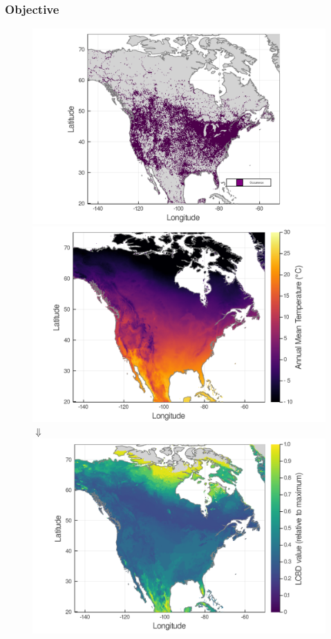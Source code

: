 \documentclass[10pt]{beamer}
\begin{document}
\begin{frame}
  \frametitle{Objective}
  \begin{figure}
    \centering
    \hspace*{-0cm}\includegraphics[scale=0.06]{fig/01_raw_singlesp.png}%
    \hspace*{0cm}\includegraphics[scale=0.06]{fig/wc_temp.png}
    \vfill
    $\Downarrow$
    \vfill
    \includegraphics[scale=0.10]{fig/05_sdm_lcbd.png}
  \end{figure}
\end{frame}
\end{document}
